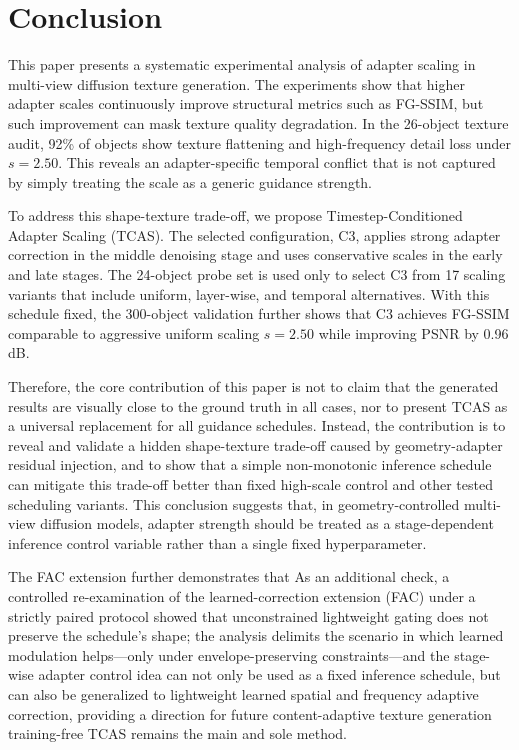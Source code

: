 \documentclass[times,twocolumn,final]{elsarticle}
\providecommand{\DIFadd}[1]{{\protect\color{red} \sf #1}} %
\providecommand{\DIFdel}[1]{{\protect\color{red} \scriptsize #1}} %
\providecommand{\DIFaddbegin}{} %
\providecommand{\DIFaddend}{} %
\providecommand{\DIFdelbegin}{} %
\providecommand{\DIFdelend}{} %
\newcommand{\DIFscaledelfig}{0.5}
\newlength{\DIFdelgraphicswidth} %
\newlength{\DIFdelgraphicsheight} %
\newcommand{\DIFaddincludegraphics}[2][]{{\color{red}\fbox{\DIFOincludegraphics[#1]{#2}}}} %
\newcommand{\DIFdelincludegraphics}[2][]{%
\sbox{\DIFdelgraphicsbox}{\DIFOincludegraphics[#1]{#2}}%
\settoboxwidth{\DIFdelgraphicswidth}{\DIFdelgraphicsbox} %
\settoboxtotalheight{\DIFdelgraphicsheight}{\DIFdelgraphicsbox} %
\scalebox{\DIFscaledelfig}{%
\parbox[b]{\DIFdelgraphicswidth}{\usebox{\DIFdelgraphicsbox}\\[-\baselineskip] \rule{\DIFdelgraphicswidth}{0em}}\llap{\resizebox{\DIFdelgraphicswidth}{\DIFdelgraphicsheight}{%
\setlength{\unitlength}{\DIFdelgraphicswidth}%
\begin{picture}(1,1)%
\thicklines\linethickness{2pt} %
{\color[rgb]{1,0,0}\put(0,0){\framebox(1,1){}}}%
{\color[rgb]{1,0,0}\put(0,0){\line( 1,1){1}}}%
{\color[rgb]{1,0,0}\put(0,1){\line(1,-1){1}}}%
\end{picture}%
}\hspace*{3pt}}} %
} %
\DeclareRobustCommand{\DIFaddbegin}{\DIFOaddbegin \let\includegraphics\DIFaddincludegraphics} %
\DeclareRobustCommand{\DIFaddend}{\DIFOaddend \let\includegraphics\DIFOincludegraphics} %
\DeclareRobustCommand{\DIFdelbegin}{\DIFOdelbegin \let\includegraphics\DIFdelincludegraphics} %
\DeclareRobustCommand{\DIFdelend}{\DIFOaddend \let\includegraphics\DIFOincludegraphics} %
\begin{document}
\section{Conclusion}
\label{sec:conclusion}

This paper presents a systematic experimental analysis of adapter scaling in multi-view diffusion texture generation. The experiments show that higher adapter scales continuously improve structural metrics such as FG-SSIM, but such improvement can mask texture quality degradation. In the 26-object texture audit, 92\% of objects show texture flattening and high-frequency detail loss under $s = 2.50$. This reveals an adapter-specific temporal conflict that is not captured by simply treating the scale as a generic guidance strength.

To address this shape-texture trade-off, we propose Timestep-Conditioned Adapter Scaling (TCAS). The selected configuration, C3, applies strong adapter correction in the middle denoising stage and uses conservative scales in the early and late stages. The 24-object probe set is used only to select C3 from 17 scaling variants that include uniform, layer-wise, and temporal alternatives. With this schedule fixed, the 300-object validation further shows that C3 achieves FG-SSIM comparable to aggressive uniform scaling $s = 2.50$ while improving PSNR by 0.96 dB.

Therefore, the core contribution of this paper is not to claim that the generated results are visually close to the ground truth in all cases, nor to present TCAS as a universal replacement for all guidance schedules. Instead, the contribution is to reveal and validate a hidden shape-texture trade-off caused by geometry-adapter residual injection, and to show that a simple non-monotonic inference schedule can mitigate this trade-off better than fixed high-scale control and other tested scheduling variants. This conclusion suggests that, in geometry-controlled multi-view diffusion models, adapter strength should be treated as a stage-dependent inference control variable rather than a single fixed hyperparameter.

\DIFdelbegin \DIFdel{The FAC extension further demonstrates that }\DIFdelend \DIFaddbegin \DIFadd{As an additional check, a controlled re-examination of the learned-correction extension (FAC) under a strictly paired protocol showed that unconstrained lightweight gating does not preserve the schedule's shape; the analysis delimits the scenario in which learned modulation helps---only under envelope-preserving constraints---and }\DIFaddend the \DIFdelbegin \DIFdel{stage-wise adapter control idea can not only be used as a fixed inference schedule, but can also be generalized to lightweight learned spatial and frequency adaptive correction, providing a direction for future content-adaptive texture generation}\DIFdelend \DIFaddbegin \DIFadd{training-free TCAS remains the main and sole method}\DIFaddend .
\end{document}
